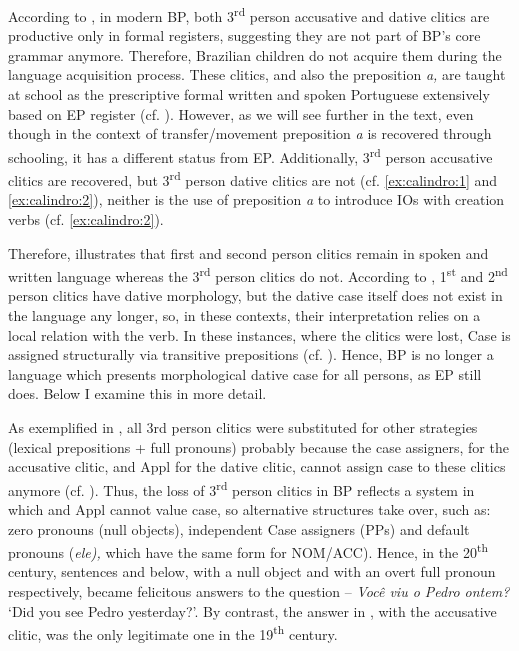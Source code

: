 \documentclass[output=paper,colorlinks,citecolor=brown,modfonts,nonflat]{langsci/langscibook}
\begin{document}
According to \citet{Kato2005}, in modern BP, both 3\textsuperscript{rd} person accusative and dative clitics are productive only in formal registers, suggesting they are not part of BP’s core grammar anymore. Therefore, Brazilian children do not acquire them during the language acquisition process. These clitics, and also the preposition \textit{a,} are taught at school as the prescriptive formal written and spoken Portuguese extensively based on EP register (cf. \citealt{KatoCyrinoCorrêa2009}). However, as we will see further in the text, even though in the context of transfer/movement preposition \textit{a} is recovered through schooling, it has a different status from EP. Additionally, 3\textsuperscript{rd} person accusative clitics are recovered, but 3\textsuperscript{rd} person dative clitics are not (cf. \ref{ex:calindro:1} and \ref{ex:calindro:2}), neither is the use of preposition \textit{a} to introduce IOs with creation verbs (cf. \ref{ex:calindro:2}).

Therefore,  illustrates that first and second person clitics remain in spoken and written language whereas the 3\textsuperscript{rd} person clitics do not. According to \citet{Galves2018}, 1\textsuperscript{st} and 2\textsuperscript{nd} person clitics have dative morphology, but the dative case itself does not exist in the language any longer, so, in these contexts, their interpretation relies on a local relation with the verb. In these instances, where the clitics were lost, Case is assigned structurally via transitive prepositions (cf. \citealt{TorresMoraisSalles2010,Calindro2015,Calindro2016,CarvalhoCalindro2018}). Hence, BP is no longer a language which presents morphological dative case for all persons, as EP still does. Below I examine this in more detail.

As exemplified in , all 3rd person clitics were substituted for other strategies (lexical prepositions + full pronouns) probably because the case assigners, {\liv} for the accusative clitic, and Appl for the dative clitic, cannot assign case to these clitics anymore (cf. \citealt{CarvalhoCalindro2018}). Thus, the loss of 3\textsuperscript{rd} person clitics in BP reflects a system in which {\liv} and Appl cannot value case, so alternative structures take over, such as: zero pronouns (null objects), independent Case assigners (PPs) and default pronouns (\textit{ele),} which have the same form for NOM/ACC). Hence, in the 20\textsuperscript{th} century, sentences  and  below, with a null object and with an overt full pronoun respectively, became felicitous answers to the question – \textit{Você viu o Pedro ontem?} ‘Did you see Pedro yesterday?’. By contrast, the answer in , with the accusative clitic, was the only legitimate one in the 19\textsuperscript{th} century.
\end{document}
